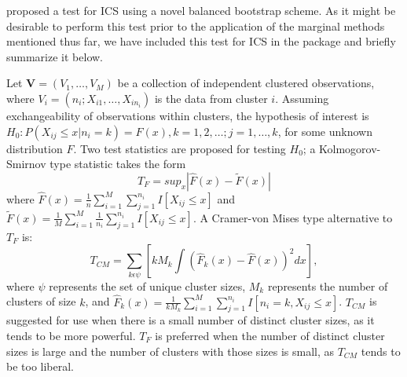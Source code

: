 \citet{nevalainen17} proposed a test for ICS using a novel balanced bootstrap scheme. As it might be desirable to perform this test prior to the application of the marginal methods mentioned thus far, we have included this test for ICS in the  package and briefly summarize it below.

Let $\bm{V}=\left(V_{1},\ldots,V_{M}\right)$ be a collection of independent clustered observations, where $V_{i}=\left(n_{i}; X_{i1},\ldots,X_{in_{i}}\right)$ is the data from cluster $i$. Assuming exchangeability of observations within clusters, the hypothesis of interest is $H_{0}: P\left(X_{ij}\leq x|n_{i}=k\right)=F(x),k=1,2,\dots;j=1,\ldots,k$, for some unknown distribution $F$. Two test statistics are proposed for testing $H_{0}$; a Kolmogorov-Smirnov type statistic takes the form
\begin{equation*}
	T_{F}=sup_{x}|\hat{F}(x)-\tilde{F}(x)|
\end{equation*}	
where $\hat{F}(x)=\frac{1}{n}\sum_{i=1}^{M}\sum_{j=1}^{n_{i}}I\left[X_{ij}\leq x\right]$ and $\tilde{F}(x)=\frac{1}{M}\sum_{i=1}^{M}\frac{1}{n_{i}}\sum_{j=1}^{n_{i}}I\left[X_{ij}\leq x\right]$. A Cramer-von Mises type alternative to $T_F$ is:
\begin{equation*}
	T_{CM}=\sum_{k\epsilon \psi} \left[kM_{k}\int{}\left(\hat{F}_{k}\left(x\right)-\hat{F}\left(x\right)\right)^{2}dx\right],
\end{equation*}
where $\psi$ represents the set of unique cluster sizes, $M_{k}$ represents the number of clusters of size $k$, and $\hat{F}_{k}(x)=\frac{1}{kM_{k}}\sum_{i=1}^{M}\sum_{j=1}^{n_{i}}I\left[n_{i}=k, X_{ij}\leq x\right]$. $T_{CM}$ is suggested for use when there is a small number of distinct cluster sizes, as it tends to be more powerful. $T_{F}$ is preferred when the number of distinct cluster sizes is large and the number of clusters with those sizes is small, as $T_{CM}$ tends to be too liberal.

